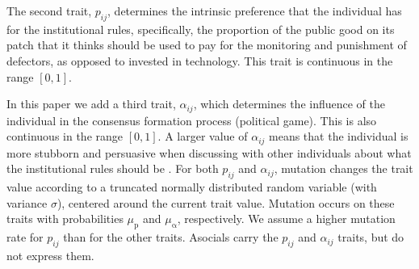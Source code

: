 \documentclass{rstb}
\begin{document}
\begin{linenumbers}
The second trait, $p_{ij}$, determines the intrinsic preference that the individual has for the institutional rules, specifically, the proportion of the public good on its patch that it thinks should be used to pay for the monitoring and punishment of defectors, as opposed to invested in technology. This trait is continuous in the range $[0,1]$. 

In this paper we add a third trait, $\alpha_{ij}$, which determines the influence of the individual in the consensus formation process (political game). This is also continuous in the range $[0,1]$. A larger value of $\alpha_{ij}$ means that the individual is more stubborn and persuasive when discussing with other individuals about what the institutional rules should be \cite{Gavrilets:2016:a,Perret:2020:a,Perret:2022:a}. For both $p_{ij}$ and $\alpha_{ij}$, mutation changes the trait value according to a truncated normally distributed random variable (with variance $\sigma$), centered around the current trait value. Mutation occurs on these traits with probabilities $\mu_\mathrm{p}$ and $\mu_\mathrm{\alpha}$, respectively. We assume a higher mutation rate for $p_{ij}$ than for the other traits. Asocials carry the $p_{ij}$ and  $\alpha_{ij}$ traits, but do not express them. 


\end{linenumbers}
\end{document}
